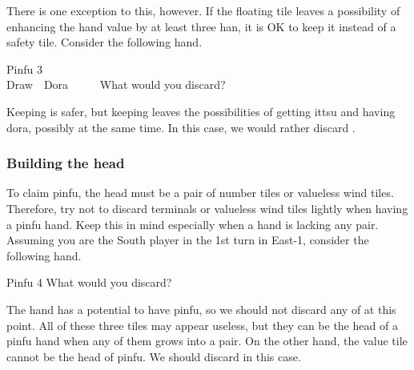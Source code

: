 \bigskip
There is one exception to this, however. If the floating tile leaves a possibility of enhancing the hand value by at least three {\jap han}, it is OK to keep it instead of a safety tile. Consider the following hand. 

\bigskip
\begin{itembox}[r]{{\jap Pinfu} 3}
\bp
{}~\xi~\\
\hfill\footnotesize{Draw~~{\jap Dora}~~~~~}
\ep
\vspace{-17pt}What would you discard? \vspace{-5pt}
\end{itembox}

\bigskip
Keeping {\LARGE\xi} is safer, but keeping {\LARGE{}} leaves the possibilities of getting {\jap ittsu} and having {\jap dora}, possibly at the same time. In this case, we would rather discard {\LARGE\xi}. 


\subsubsection{Building the head}
To claim {\jap pinfu}, the head must be a pair of number tiles or valueless wind tiles. Therefore, try not to discard terminals or valueless wind tiles lightly when having a {\jap pinfu} hand. Keep this in mind especially when a hand is lacking any pair. Assuming you are the South player in the 1st turn in East-1, consider the following hand. 

\bigskip
\begin{itembox}[r]{{\jap Pinfu} 4}
\bp
{}\xi\fa
\ep
\vspace{-10pt}What would you discard? \vspace{-5pt}
\end{itembox}

\bigskip
The hand has a potential to have {\jap pinfu}, so we should not discard any of {\LARGE{}\xi} at this point. All of these three tiles may appear useless, but they can be the head of a {\jap pinfu} hand when any of them grows into a pair. On the other hand, the value tile {\LARGE\fa} cannot be the head of {\jap pinfu}. We should discard {\LARGE\fa} in this case. 

\newpage
